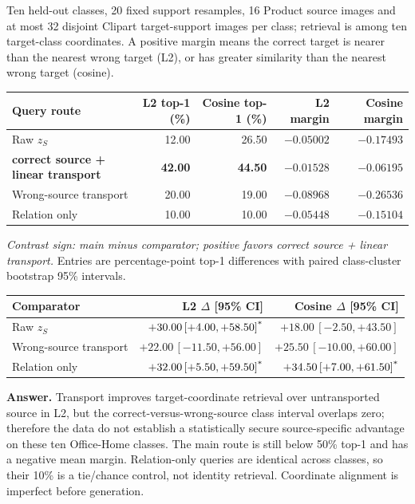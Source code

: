 \documentclass[10pt]{article}
\newcommand{\sig}{\textsuperscript{*}}
\newcommand{\mname}{\textbf{correct source + linear transport}}
\begin{document}
Ten held-out classes, 20 fixed support resamples, 16 Product source images and at most 32 disjoint Clipart target-support images per class; retrieval is among ten target-class coordinates. A positive margin means the correct target is nearer than the nearest wrong target (L2), or has greater similarity than the nearest wrong target (cosine).

\begin{center}\small
\begin{tabular}{lrrrr}
\toprule
Query route & L2 top-1 (\%) & Cosine top-1 (\%) & L2 margin & Cosine margin\\
\midrule
Raw $z_S$ & 12.00 & 26.50 & $-0.05002$ & $-0.17493$\\
\mname & \textbf{42.00} & \textbf{44.50} & $-0.01528$ & $-0.06195$\\
Wrong-source transport & 20.00 & 19.00 & $-0.08968$ & $-0.26536$\\
Relation only & 10.00 & 10.00 & $-0.05448$ & $-0.15104$\\
\bottomrule
\end{tabular}
\end{center}

\emph{Contrast sign: main minus comparator; positive favors correct source + linear transport.} Entries are percentage-point top-1 differences with paired class-cluster bootstrap 95\% intervals.

\begin{center}\small
\begin{tabular}{lrr}
\toprule
Comparator & L2 $\Delta$ [95\% CI] & Cosine $\Delta$ [95\% CI]\\
\midrule
Raw $z_S$ & $+30.00\,[+4.00,+58.50]\sig$ & $+18.00\,[-2.50,+43.50]$\\
Wrong-source transport & $+22.00\,[-11.50,+56.00]$ & $+25.50\,[-10.00,+60.00]$\\
Relation only & $+32.00\,[+5.50,+59.50]\sig$ & $+34.50\,[+7.00,+61.50]\sig$\\
\bottomrule
\end{tabular}
\end{center}

\textbf{Answer.} Transport improves target-coordinate retrieval over untransported source in L2, but the correct-versus-wrong-source class interval overlaps zero; therefore the data do not establish a statistically secure source-specific advantage on these ten Office-Home classes. The main route is still below 50\% top-1 and has a negative mean margin. Relation-only queries are identical across classes, so their 10\% is a tie/chance control, not identity retrieval. Coordinate alignment is imperfect before generation.
\end{document}
